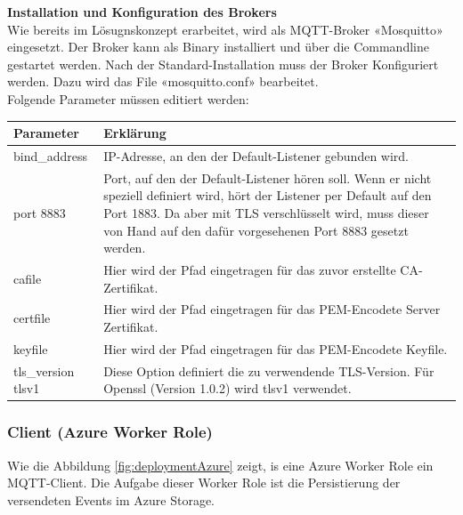 \textbf{Installation und Konfiguration des Brokers} \\
Wie bereits im Lösugnskonzept erarbeitet, wird als MQTT-Broker «Mosquitto» eingesetzt. Der Broker kann als Binary installiert und über die Commandline gestartet werden.
Nach der Standard-Installation muss der Broker Konfiguriert werden. Dazu wird das File «mosquitto.conf» bearbeitet.
\\Folgende Parameter müssen editiert werden:

\begin{tabularx}{\textwidth}{lX}
		\textbf{Parameter} & \textbf{Erklärung}
		\\ \hline
			bind\_address \tbd &
			IP-Adresse, an den der Default-Listener gebunden wird.
		\\ \hline
			port 8883 &
			Port, auf den der Default-Listener hören soll. Wenn er nicht speziell definiert wird, hört der Listener per Default auf den Port 1883. Da aber mit TLS verschlüsselt wird, muss dieser von Hand auf den dafür vorgesehenen Port 8883 gesetzt werden.
		\\ \hline
			cafile \tbd &
			Hier wird der Pfad eingetragen für das zuvor erstellte CA-Zertifikat.
		\\ \hline
			certfile \tbd &
			Hier wird der Pfad eingetragen für das PEM-Encodete Server Zertifikat.
		\\ \hline
			keyfile \tbd &
			Hier wird der Pfad eingetragen für das PEM-Encodete Keyfile.
		\\ \hline
			tls\_version tlsv1 &
			Diese Option definiert die zu verwendende TLS-Version. Für Openssl (Version 1.0.2) wird tlsv1 verwendet.
		\\ \hline
\end{tabularx}

\subsubsection{Client (Azure Worker Role)}
Wie die Abbildung \ref{fig:deploymentAzure} zeigt, is eine Azure Worker Role ein MQTT-Client. Die Aufgabe dieser Worker Role ist die Persistierung der versendeten Events im Azure Storage.












